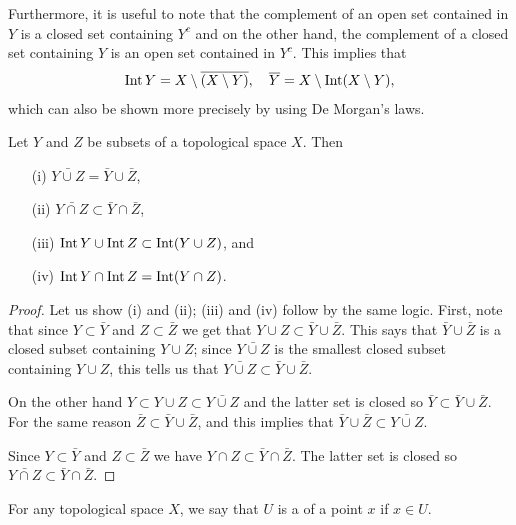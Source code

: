Furthermore, it is useful to note that the complement of an open set contained in $Y$ is a closed set containing $Y^c$ and on the other hand, the complement of a closed set containing $Y$ is an open set contained in $Y^c$. This implies that
\begin{align}
  \label{int-versus-closure}
  \operatorname{Int} Y = X \setminus \overline{(X \setminus Y)}, \quad \overline{Y} = X \setminus \operatorname{Int}(X \setminus Y),
\end{align}
which can also be shown more precisely by using De Morgan's laws.
\begin{prop}
  Let $Y$ and $Z$ be subsets of a topological space $X$. Then
  \begin{enumerate}
    \item[(i)] $\bar{Y \cup Z} = \bar Y \cup \bar Z$,
    \item[(ii)] $\bar{Y \cap Z} \subset \bar Y \cap \bar Z$,
    \item[(iii)] $\operatorname{Int} Y \cup \operatorname{Int} Z \subset \operatorname{Int}(Y \cup Z)$, and
    \item[(iv)] $\operatorname{Int} Y \cap \operatorname{Int} Z = \operatorname{Int} (Y \cap Z)$.
  \end{enumerate}
\end{prop}
\begin{proof}
  Let us show (i) and (ii); (iii) and (iv) follow by the same logic. First, note that since $Y \subset \bar Y$ and $Z \subset \bar Z$ we get that $Y \cup Z \subset \bar Y \cup \bar Z$. This says that $\bar Y \cup \bar Z$ is a closed subset containing $Y \cup Z$; since $\bar{Y \cup Z}$ is the smallest closed subset containing $Y \cup Z$, this tells us that $\bar{Y \cup Z} \subset \bar Y \cup \bar Z$.
  
  On the other hand $Y \subset Y \cup Z \subset \bar {Y \cup Z}$ and the latter set is closed so $\bar Y \subset \bar Y \cup \bar Z$. For the same reason $\bar Z \subset \bar Y \cup \bar Z$, and this implies that $\bar Y \cup \bar Z \subset \bar { Y \cup Z}$.
  
  Since $Y \subset \bar Y$ and $Z \subset \bar Z$ we have $Y \cap Z \subset \bar Y \cap \bar Z$. The latter set is closed so $\bar {Y\cap Z} \subset \bar Y \cap \bar Z$.
\end{proof}
For any topological space $X$, we say that $U$ is a  of a point $x$ if $x \in U$.


